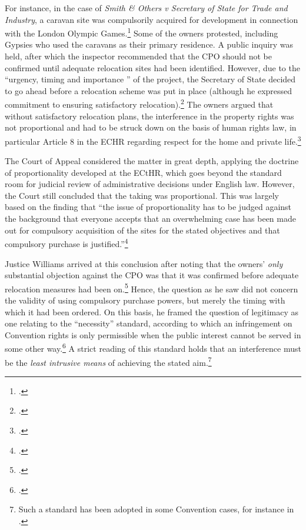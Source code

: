 For instance, in the case of {\it Smith \& Others v Secretary of State for Trade and Industry}, a caravan site was compulsorily acquired for development in connection with the London Olympic Games.\footcite{smith08} Some of the owners protested, including  Gypsies who used the caravans as their primary residence. A public inquiry was held, after which the inspector recommended that the CPO should not be confirmed until adequate relocation sites had been identified. However, due to the ``urgency, timing and importance '' of the project, the Secretary of State decided to go ahead before a relocation scheme was put in place (although he expressed commitment to ensuring satisfactory relocation).\footcite[10]{smith08} The owners argued that without satisfactory relocation plans, the interference in the property rights was not proportional and had to be struck down on the basis of human rights law, in particular Article 8 in the ECHR regarding respect for the home and private life.\footcite[27-51]{smith08}

The Court of Appeal considered the matter in great depth, applying the doctrine of proportionality developed at the ECtHR, which goes beyond the standard room for judicial review of administrative decisions under English law. However, the Court still concluded that the taking was proportional. This was largely based on the finding that ``the issue of proportionality has to be judged against the background that everyone accepts that an overwhelming case has been made out for compulsory acquisition of the sites for the stated objectives and that compulsory purchase is justified.''\footcite[42]{smith08} 

Justice Williams arrived at this conclusion after noting that the owners' {\it only} substantial objection against the CPO was that it was confirmed before adequate relocation measures had been  on.\footcite[42]{smith08} Hence, the question as he saw did not concern the validity of using compulsory purchase powers, but merely the timing with which it had been ordered. On this basis, he framed the question of legitimacy as one relating to the ``necessity'' standard, according to which an infringement on Convention rights is only permissible when the public interest cannot be served in some other way.\footcite[43]{smith08} A strict reading of this standard holds that an interference must be the {\it least intrusive means} of achieving the stated aim.\footnote{Such a standard has been adopted in some Convention cases, for instance in \cite{samaroo01}.}

